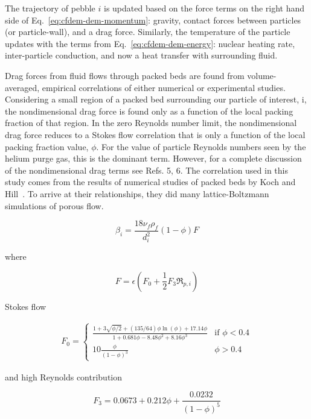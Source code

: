 The trajectory of pebble $i$ is updated based on the force terms on the right hand side of Eq.~\ref{eq:cfdem-dem-momentum}: gravity, contact forces between particles (or particle-wall), and a drag force. Similarly, the temperature of the particle updates with the terms from Eq.~\ref{eq:cfdem-dem-energy}: nuclear heating rate, inter-particle conduction, and now a heat transfer with surrounding fluid.

Drag forces from fluid flows through packed beds are found from volume-averaged, empirical correlations of either numerical or experimental studies. Considering a small region of a packed bed surrounding our particle of interest, i, the nondimensional drag force is found only as a function of the local packing fraction of that region. In the zero Reynolds number limit, the nondimensional drag force reduces to a Stokes flow correlation that is only a function of the local packing fraction value, $\phi$. For the value of particle Reynolds numbers seen by the helium purge gas, this is the dominant term. However, for a complete discussion of the nondimensional drag terms see Refs. 5, 6. The correlation used in this study comes from the results of numerical studies of packed beds by Koch and Hill~\cite{Koch2001, Gruber2012, Benyahia2006}. To arrive at their relationships, they did many lattice-Boltzmann simulations of porous flow.

\begin{equation}
	\beta_{i} = \frac{18\nu_f\rho_f}{d_{i}^2}(1-\phi) F
\end{equation}

where 

\begin{equation}
	F = \epsilon (F_0 + \frac{1}{2}F_3 \Re_{p,i})
\end{equation}

Stokes flow

\begin{align}
F_0 = 
	\begin{cases}
    		\frac{1+3\sqrt{\phi/2} + (135/64)\phi\ln(\phi) + 17.14\phi}{1 + 0.681\phi - 8.48\phi^2 + 8.16 \phi^3}	& \text{if } \phi < 0.4\\
    		10\frac{\phi}{(1-\phi)^3}              																& \phi > 0.4
	\end{cases}
\end{align}

and high Reynolds contribution

\begin{equation}
	F_3 = 0.0673 + 0.212\phi + \frac{0.0232}{(1-\phi)^5}
\end{equation}



